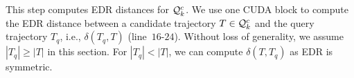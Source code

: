 \documentclass[10pt,conference,letterpaper]{IEEEtran}
\newcommand{\simcand}{{{\cal Q}_k^c}\xspace}
\newcommand{\edr}{{\delta}\xspace}
\begin{document}
This step computes EDR distances for $\simcand$.
We use one CUDA block to compute the EDR distance between a candidate trajectory $T\in\simcand$ and the query trajectory $T_q$, i.e., $\edr(T_q, T)$ (line~$16$-$24$).
Without loss of generality, we assume $|T_q|\geq |T|$ in this section.
For $|T_q|<|T|$, we can compute $\edr(T,T_q)$ as EDR is symmetric.
\end{document}

